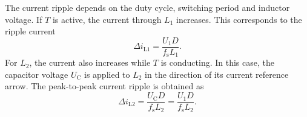 
\begin{solutionblock}
	The current ripple depends on the duty cycle, switching period and inductor voltage.
	If $T$ is active, the current through $L_1$ increases. This corresponds to the ripple current
	\begin{equation}
		\Delta i_\mathrm{L1}=\frac{U_\mathrm{1}D}{f_\mathrm{s}L_\mathrm{1}}.
	\end{equation}
	For $L_2$, the current also increases while $T$ is conducting.
	In this case, the capacitor voltage $U_\mathrm{C}$ is applied
	to $L_2$ in the direction of its current reference arrow.
	The peak-to-peak current ripple is obtained as
	\begin{equation}
		\Delta i_\mathrm{L2}
		= \frac{U_\mathrm{C}D}{f_\mathrm{s}L_2}
		= \frac{U_1D}{f_\mathrm{s}L_2}.
	\end{equation}
\end{solutionblock}


